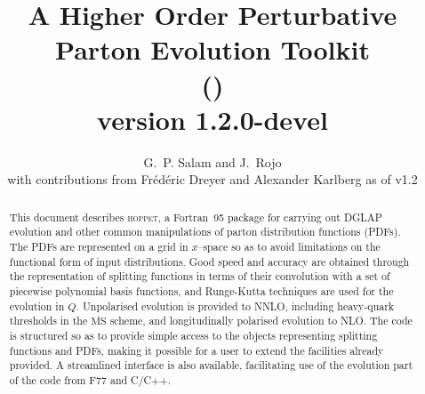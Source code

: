 \documentclass[12pt]{article}
\title{A Higher Order Perturbative Parton Evolution Toolkit \\
(\hoppet)\\
version 1.2.0-devel
}
\author{G.~P. Salam and J.~Rojo\\
  with contributions from Fr\'ed\'eric Dreyer and Alexander Karlberg as
  of v1.2
}
\date{}
\newcommand{\MSbar}{\overline{\mathrm{MS}}}
\newcommand{\hoppet}{\textsc{hoppet}\xspace}
\begin{document}
\maketitle 

\begin{abstract}
  This document describes \hoppet, a Fortran~95 package for carrying out DGLAP
  evolution and other common manipulations of parton distribution
  functions (PDFs). The PDFs are represented on a grid in $x$--space so
  as to avoid limitations on the functional form of input
  distributions.  Good speed and accuracy are obtained through the
  representation of splitting functions in terms of their convolution
  with a set of piecewise polynomial basis functions, and Runge-Kutta
  techniques are used for the evolution in $Q$.  Unpolarised evolution
  is provided to NNLO, including heavy-quark thresholds in the
  $\MSbar$ scheme, and longitudinally polarised evolution to NLO. The
  code is structured so as to provide simple access to the objects
  representing splitting functions and PDFs, making it possible for a
  user to extend the facilities already provided.
%
  A streamlined interface is also available, facilitating use of the
  evolution part of the code from F77 and C/C++.  \smallskip
\end{abstract}

\newpage


\\
\end{document}
